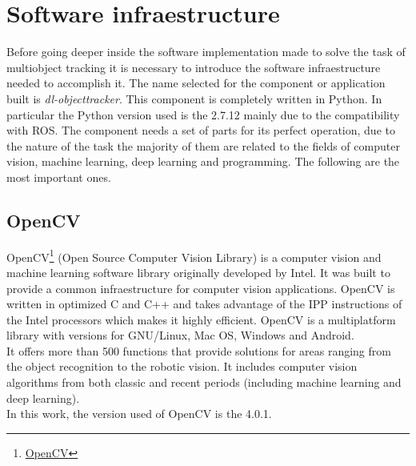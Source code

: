 \chapter{Software infraestructure}

Before going deeper inside the software implementation made to solve the task of multiobject tracking it is necessary to introduce the software infraestructure needed to accomplish it. The name selected for the component or application built is \textit{dl-objecttracker}. This component is completely written in Python. In particular the Python version used is the 2.7.12 mainly due to the compatibility with ROS. The component needs a set of parts for its perfect operation, due to the nature of the task the majority of them are related to the fields of computer vision, machine learning, deep learning and programming. The following are the most important ones.

\section{OpenCV}
OpenCV\footnote {\href{https://opencv.org/}{OpenCV}} (Open Source Computer Vision Library) is a computer vision and machine learning software library originally developed by Intel. It was built to provide a common infraestructure for computer vision applications. OpenCV is written in optimized C and C++ and takes advantage of the IPP instructions of the Intel processors which makes it highly efficient. OpenCV is a multiplatform library with versions for GNU/Linux, Mac OS, Windows and Android.\\ It offers more than 500 functions that provide solutions for areas ranging from the object recognition to the robotic vision. It includes computer vision algorithms from both classic and recent periods (including machine learning and deep learning).\\
In this work, the version used of OpenCV is the 4.0.1.

